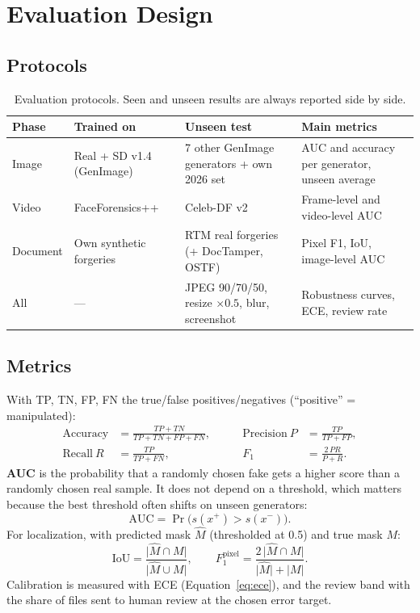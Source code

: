 \documentclass[11pt,a4paper]{article}
\begin{document}
\section{Evaluation Design}
\label{sec:evaluation}

\subsection{Protocols}
\begin{table}[H]
\centering
\small
\begin{tabularx}{\linewidth}{@{}l Y Y Y@{}}
\toprule
\textbf{Phase} & \textbf{Trained on} & \textbf{Unseen test} & \textbf{Main metrics} \\
\midrule
Image & Real + SD v1.4 (GenImage) & 7 other GenImage generators + own 2026 set & AUC and accuracy per generator, unseen average \\
Video & FaceForensics++ & Celeb-DF v2 & Frame-level and video-level AUC \\
Document & Own synthetic forgeries & RTM real forgeries (+ DocTamper, OSTF) & Pixel F1, IoU, image-level AUC \\
All & --- & JPEG 90/70/50, resize $\times0.5$, blur, screenshot & Robustness curves, ECE, review rate \\
\bottomrule
\end{tabularx}
\caption{Evaluation protocols. Seen and unseen results are always reported side by side.}
\label{tab:protocols}
\end{table}

\subsection{Metrics}
With TP, TN, FP, FN the true/false positives/negatives (``positive'' = manipulated):
\begin{equation}
\begin{aligned}
  \text{Accuracy}&=\frac{TP+TN}{TP+TN+FP+FN}, &\qquad \text{Precision}\ P&=\frac{TP}{TP+FP},\\[4pt]
  \text{Recall}\ R&=\frac{TP}{TP+FN}, &\qquad F_1&=\frac{2\,PR}{P+R}.
\end{aligned}
\end{equation}
\textbf{AUC} is the probability that a randomly chosen fake gets a higher score than a randomly
chosen real sample. It does not depend on a threshold, which matters because the best threshold
often shifts on unseen generators:
\begin{equation}
  \text{AUC}=\Pr\bigl(s(x^{+})>s(x^{-})\bigr).
\end{equation}
For localization, with predicted mask $\hat M$ (thresholded at 0.5) and true mask $M$:
\begin{equation}
  \text{IoU}=\frac{\lvert\hat M\cap M\rvert}{\lvert\hat M\cup M\rvert},\qquad
  F_1^{\text{pixel}}=\frac{2\,\lvert\hat M\cap M\rvert}{\lvert\hat M\rvert+\lvert M\rvert}.
\end{equation}
Calibration is measured with ECE (Equation~\ref{eq:ece}), and the review band with the share of
files sent to human review at the chosen error target.
\end{document}
